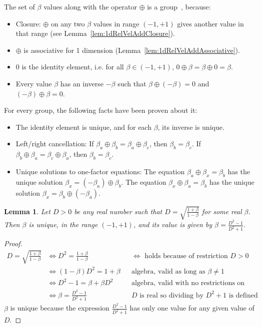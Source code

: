 \documentclass[a4paper]{article}
\theoremstyle{plain}
\newtheorem{lemma}[theorem]{Lemma}
\theoremstyle{definition}
\begin{document}
The set of $\beta$ values along with the operator $\oplus$ is a
group~\cite{GroupMathematics}, because:
\begin{itemize}
\item Closure: $\oplus$ on any two $\beta$ values in range $(-1, +1)$
  gives another value in that range
  (see Lemma~\ref{lem:1dRelVelAddClosure}).
\item $\oplus$ is associative for 1 dimension
  (Lemma~\ref{lem:1dRelVelAddAssociative}).
\item $0$ is the identity element, i.e. for all $\beta \in (-1, +1)$,
  $0 \oplus \beta = \beta \oplus 0 = \beta$.
\item Every value $\beta$ has an inverse $-\beta$ such that
  $\beta \oplus (-\beta)=0$ and $(-\beta) \oplus \beta=0$.
\end{itemize}
For every group, the following facts have been proven about it:
\begin{itemize}
\item The identity element is unique, and for each $\beta$, its
  inverse is unique.
\item Left/right cancellation:
  If $\beta_a \oplus \beta_b = \beta_a \oplus \beta_c$,
  then $\beta_b = \beta_c$.
  If $\beta_b \oplus \beta_a = \beta_c \oplus \beta_a$,
  then $\beta_b = \beta_c$.
\item Unique solutions to one-factor equations:
  The equation $\beta_a \oplus \beta_x = \beta_b$
  has the unique solution $\beta_x = (-\beta_a) \oplus \beta_b$.
  The equation $\beta_x \oplus \beta_a = \beta_b$
  has the unique solution $\beta_x = \beta_b \oplus (-\beta_a)$.
\end{itemize}


\begin{lemma}
\label{lem:DdeterminesBeta}
Let $D > 0$ be any real number such that
$D = \sqrt{ \frac{1+\beta}{1-\beta} }$ for some real $\beta$.
Then $\beta$ is unique, in the range $(-1, +1)$, and its value is
given by $\beta = \frac{D^2-1}{D^2+1}$.
\end{lemma}

\begin{proof}
\begin{align*}
D = \sqrt{ \frac{1+\beta}{1-\beta} }
  & \Leftrightarrow D^2 = \frac{1+\beta}{1-\beta} & & \text{$\Leftrightarrow$ holds because of restriction $D > 0$} \\
  & \Leftrightarrow (1-\beta) D^2 = 1+\beta & & \text{algebra, valid as long as $\beta \neq 1$} \\
  & \Leftrightarrow D^2-1 = \beta + \beta D^2 & & \text{algebra, valid with no restrictions on real values} \\
  & \Leftrightarrow \beta = \frac{D^2-1}{D^2+1} & & \text{$D$ is real so dividing by $D^2+1$ is defined}
\end{align*}
$\beta$ is unique because the expression $\frac{D^2-1}{D^2+1}$ has
only one value for any given value of $D$.
\end{proof}
\end{document}
